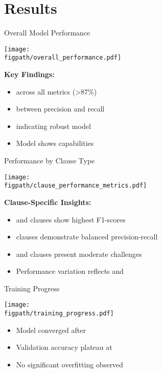 
\section{Results}

\begin{frame}{Overall Model Performance}
\begin{center}
\texttt{[image: \\figpath/overall\_performance.pdf]}
\end{center}

\textbf{Key Findings:}
\begin{itemize}
    \item {} across all metrics (>87\%)
    \item {} between precision and recall
    \item {} indicating robust model
    \item Model shows  capabilities
\end{itemize}
\end{frame}

\begin{frame}{Performance by Clause Type}
\begin{center}
\texttt{[image: \\figpath/clause\_performance\_metrics.pdf]}
\end{center}

\textbf{Clause-Specific Insights:}
\begin{itemize}
    \item {} and  clauses show highest F1-scores
    \item {} clauses demonstrate balanced precision-recall
    \item {} and  clauses present moderate challenges
    \item Performance variation reflects  and 
\end{itemize}
\end{frame}

\begin{frame}{Training Progress}
\begin{center}
\texttt{[image: \\figpath/training\_progress.pdf]}
\end{center}

\begin{itemize}
    \item Model converged after 
    \item Validation accuracy plateau at 
    \item No significant overfitting observed
\end{itemize}
\end{frame}

